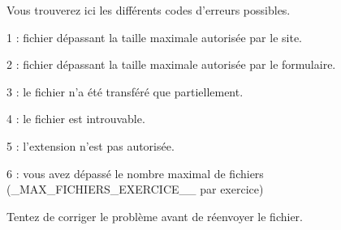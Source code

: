 ﻿Vous trouverez ici les différents codes d'erreurs possibles.
\item 1 : fichier dépassant la taille maximale autorisée par le site.
\item 2 : fichier dépassant la taille maximale autorisée par le formulaire.
\item 3 : le fichier n'a été transféré que partiellement.
\item 4 : le fichier est introuvable.
\item 5 : l'extension n'est pas autorisée.
\item 6 : vous avez dépassé le nombre maximal de fichiers (_MAX_FICHIERS_EXERCICE__ par exercice)

Tentez de corriger le problème avant de réenvoyer le fichier.